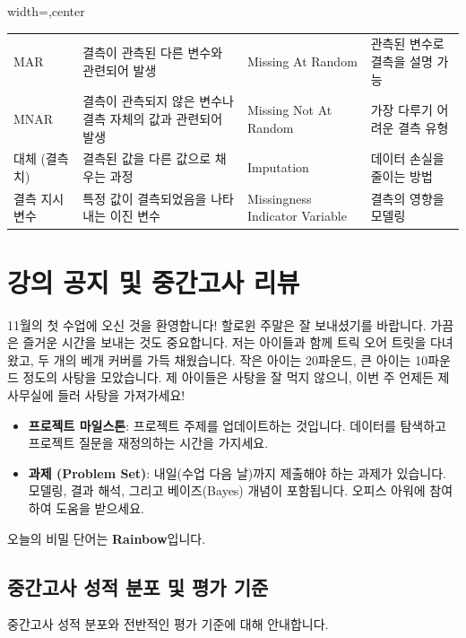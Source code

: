 \documentclass[11pt,a4paper]{article}
\theoremstyle{definition}
\newcommand{\newsection}[1]{\newpage\section{#1}}
\begin{document}
\begin{adjustbox}{width=\textwidth,center}
\begin{tabular}{llll}
MAR & 결측이 관측된 다른 변수와 관련되어 발생 & Missing At Random & 관측된 변수로 결측을 설명 가능 \\
MNAR & 결측이 관측되지 않은 변수나 결측 자체의 값과 관련되어 발생 & Missing Not At Random & 가장 다루기 어려운 결측 유형 \\
대체 (결측치) & 결측된 값을 다른 값으로 채우는 과정 & Imputation & 데이터 손실을 줄이는 방법 \\
결측 지시 변수 & 특정 값이 결측되었음을 나타내는 이진 변수 & Missingness Indicator Variable & 결측의 영향을 모델링 \\
\bottomrule
\end{tabular}
\end{adjustbox}

\newsection{강의 공지 및 중간고사 리뷰}

\begin{infobox}[title=11월 첫 수업 공지]
11월의 첫 수업에 오신 것을 환영합니다! 할로윈 주말은 잘 보내셨기를 바랍니다.
가끔은 즐거운 시간을 보내는 것도 중요합니다. 저는 아이들과 함께 트릭 오어 트릿을 다녀왔고, 두 개의 베개 커버를 가득 채웠습니다.
작은 아이는 20파운드, 큰 아이는 10파운드 정도의 사탕을 모았습니다.
제 아이들은 사탕을 잘 먹지 않으니, 이번 주 언제든 제 사무실에 들러 사탕을 가져가세요!
\end{infobox}

\begin{infobox}[title=이번 주 마감 기한]
\begin{itemize}
    \item \textbf{프로젝트 마일스톤}: 프로젝트 주제를 업데이트하는 것입니다. 데이터를 탐색하고 프로젝트 질문을 재정의하는 시간을 가지세요.
    \item \textbf{과제 (Problem Set)}: 내일(수업 다음 날)까지 제출해야 하는 과제가 있습니다. 모델링, 결과 해석, 그리고 베이즈(Bayes) 개념이 포함됩니다. 오피스 아워에 참여하여 도움을 받으세요.
\end{itemize}
\end{infobox}

\begin{tcolorbox}[infobox, title=강의 중 언급: 오늘의 비밀 단어]
오늘의 비밀 단어는 \textbf{Rainbow}입니다.
\end{tcolorbox}

\subsection*{중간고사 성적 분포 및 평가 기준}
중간고사 성적 분포와 전반적인 평가 기준에 대해 안내합니다.
\end{document}
